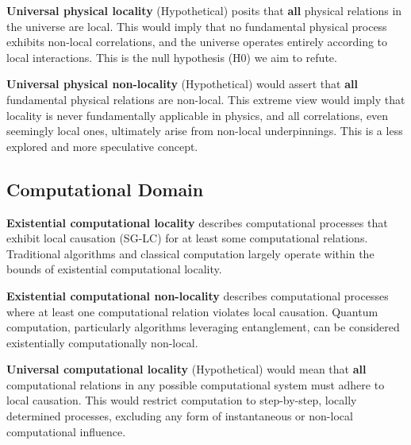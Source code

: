 \begin{definition}
	\textbf{Universal physical locality} (Hypothetical) posits that \textbf{all} physical relations in the universe are local. This would imply that no fundamental physical process exhibits non-local correlations, and the universe operates entirely according to local interactions. This is the null hypothesis (H0) we aim to refute.
\end{definition}

\begin{definition}
	\textbf{Universal physical non-locality} (Hypothetical) would assert that \textbf{all} fundamental physical relations are non-local. This extreme view would imply that locality is never fundamentally applicable in physics, and all correlations, even seemingly local ones, ultimately arise from non-local underpinnings.  This is a less explored and more speculative concept.
\end{definition}

\subsection{Computational Domain}

\begin{definition}
	\textbf{Existential computational locality} describes computational processes that exhibit local causation (SG-LC) for at least some computational relations.  Traditional algorithms and classical computation largely operate within the bounds of existential computational locality.
\end{definition}

\begin{definition}
	\textbf{Existential computational non-locality} describes computational processes where at least one computational relation violates local causation. Quantum computation, particularly algorithms leveraging entanglement, can be considered existentially computationally non-local.
\end{definition}

\begin{definition}
	\textbf{Universal computational locality} (Hypothetical) would mean that \textbf{all} computational relations in any possible computational system must adhere to local causation. This would restrict computation to step-by-step, locally determined processes, excluding any form of instantaneous or non-local computational influence.
\end{definition}

